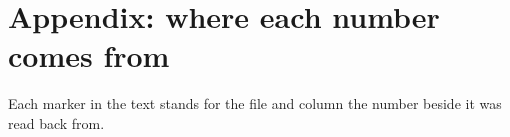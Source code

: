 \clearpage
\onecolumn
\section*{Appendix: where each number comes from}

Each \prov{} marker in the text stands for the file and column the number beside it was read back from.

